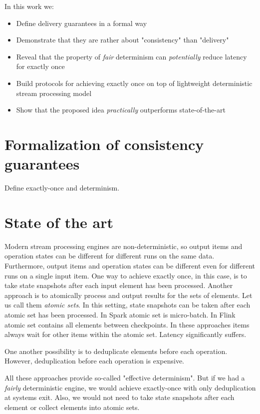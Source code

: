 \documentclass[sigconf]{acmart}
\theoremstyle{remark}
\begin{document}
In this work we:
\begin{itemize}
    \item Define delivery guarantees in a formal way
    \item Demonstrate that they are rather about "consistency" than "delivery"
    \item Reveal that the property of {\em fair} determinism can  {\em potentially} reduce latency for exactly once
    \item Build protocols for achieving exactly once on top of lightweight deterministic stream processing model 
    \item Show that the proposed idea {\em practically} outperforms state-of-the-art 
\end{itemize}

\section{Formalization of consistency guarantees}

Define exactly-once and determinism.

\section{State of the art}

Modern stream processing engines are non-deterministic, so output items and operation states can be different for different runs on the same data. Furthermore, output items and operation states can be different even for different runs on a single input item. One way to achieve exactly once, in this case, is to take state snapshots after each input element has been processed. Another approach is to atomically process and output results for the sets of elements. Let us call them {\em atomic sets}. In this setting, state snapshots can be taken after each atomic set has been processed. In Spark atomic set is micro-batch. In Flink atomic set contains all elements between checkpoints.  In these approaches items always wait for other items within the atomic set. Latency significantly suffers.    

One another possibility is to deduplicate elements before each operation. However, deduplication before each operation is expensive.

All these approaches provide so-called "effective determinism". But if we had a {\em fairly} deterministic engine, we would achieve exactly-once with only deduplication at systems exit. Also, we would not need to take state snapshots after each element or collect elements into atomic sets.
\end{document}
